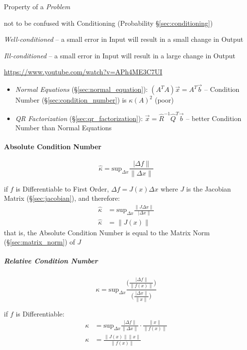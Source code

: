 {Property of a \emph{Problem}

\fist not to be confused with Conditioning (Probability
\S\ref{sec:conditioning})

\emph{Well-conditioned} -- a small error in Input will result in a small change
in Output

\emph{Ill-conditioned} -- a small error in Input will result in a large change
in Output

\url{https://www.youtube.com/watch?v=APh4ME3C7UI}

\begin{itemize}
  \item \emph{Normal Equations} (\S\ref{sec:normal_equation}): $(A^TA)\vec{x} =
    A^T\vec{b}$ -- Condition Number (\S\ref{sec:condition_number}) is
    $\kappa(A)^2$ (poor)
  \item \emph{QR Factorization} (\S\ref{sec:qr_factorization}): $\vec{x} =
    \hat{R}^{-1}\hat{Q}^T\vec{b}$ -- better Condition Number than Normal
    Equations
\end{itemize}



\paragraph{Absolute Condition Number}\label{sec:absolute_condition_number}
\hfill

\[
  \hat{\kappa} = \mathrm{sup}_{\Delta x} \frac{\ |\Delta f\|}{\|\Delta x\|}
\]

if $f$ is Differentiable to First Order, $\Delta f = J(x) \Delta x$ where $J$
is the Jacobian Matrix (\S\ref{sec:jacobian}), and therefore:
\begin{align*}
  \hat{\kappa} & = \mathrm{sup}_{\Delta x} \frac{\|J\Delta x\|}{\ |\Delta x\|} \\
  \hat{\kappa} & = \|J(x)\|
\end{align*}
that is, the Absolute Condition Number is equal to the Matrix Norm
(\S\ref{sec:matrix_norm}) of $J$



\subparagraph{Relative Condition Number}\label{sec:relative_condition_number}
\hfill

\[
  \kappa = \mathrm{sup}_{\Delta x} \frac{
    \Big(\frac{\ |\Delta f\|}{\|f(x)\|}\Big)
  }{
    \Big(\frac{\ |\Delta x\|}{\|x\|}\Big)
  }
\]

if $f$ is Differentiable:
\begin{align*}
  \kappa & = \mathrm{sup}_{\Delta x}
    \frac{\ |\Delta f\|}{\|\Delta x\|} \cdot \frac{\|x\|}{\|f(x)\|} \\
  \kappa & = \frac{\|J(x)\| \|x\|}{\|f(x)\|}
\end{align*}

}
